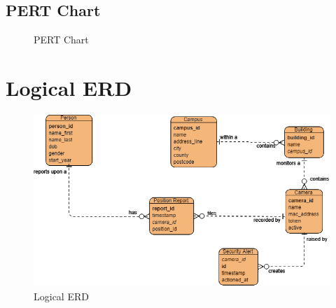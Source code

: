 \documentclass[
  english,
  a4paper,
,tablecaptionabove
]{scrartcl}
\begin{document}
\newpage

\begin{landscape}

\pagestyle{empty}

\hypertarget{pert-chart}{%
\section{PERT Chart}\label{pert-chart}}

\begin{figure}
    \caption{PERT Chart} \label{fig:pert-chart}
\end{figure}

\end{landscape}

\newpage

\hypertarget{logical-erd}{%
\section{Logical ERD}\label{logical-erd}}

\begin{figure}
\centering
\includegraphics{images/ppm-images/logical-erd.png}
\caption{Logical ERD}
\end{figure}
\end{document}
